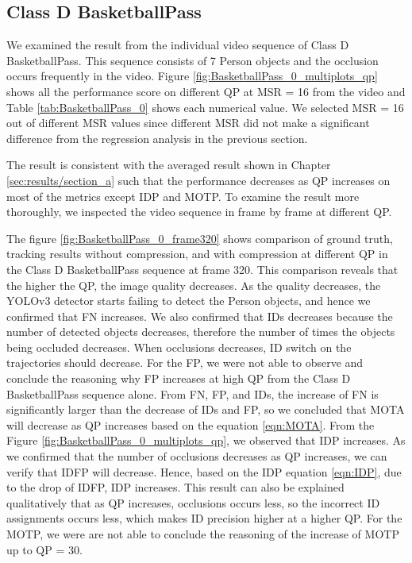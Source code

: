 \subsection{Class D BasketballPass}
We examined the result from the individual video sequence of Class D BasketballPass. This sequence consists of 7 Person objects and the occlusion occurs frequently in the video.  Figure \ref{fig:BasketballPass_0_multiplots_qp} shows all the performance score on different QP at MSR = 16 from the video and Table \ref{tab:BasketballPass_0} shows each numerical value. We selected MSR = 16 out of different MSR values since different MSR did not make a significant difference from the regression analysis in the previous section.


The result is consistent with the averaged result shown in Chapter \ref{sec:results/section_a} such that the performance decreases as QP increases on most of the metrics except IDP and MOTP. To examine the result more thoroughly, we inspected the video sequence in frame by frame at different QP.

The figure \ref{fig:BasketballPass_0_frame320} shows comparison of ground truth, tracking results without compression, and with compression at different QP in the Class D BasketballPass sequence at frame 320. This comparison reveals that the higher the QP, the image quality decreases. As the quality decreases, the YOLOv3 detector starts failing to detect the Person objects, and hence we confirmed that FN increases. We also confirmed that IDs decreases because the number of detected objects decreases, therefore the number of times the objects being occluded decreases. When occlusions decreases, ID switch on the trajectories should decrease. For the FP, we were not able to observe and conclude the reasoning why FP increases at high QP from the Class D BasketballPass sequence alone. From FN, FP, and IDs, the increase of FN is significantly larger than the decrease of IDs and FP, so we concluded that MOTA will decrease as QP increases based on the equation \ref{eqn:MOTA}. From the Figure \ref{fig:BasketballPass_0_multiplots_qp}, we observed that IDP increases. As we confirmed that the number of occlusions decreases as QP increases, we can verify that IDFP will decrease. Hence, based on the IDP equation \ref{eqn:IDP}, due to the drop of IDFP, IDP increases. This result can also be explained qualitatively that as QP increases, occlusions occurs less, so the incorrect ID assignments occurs less, which makes ID precision higher at a higher QP. For the MOTP, we were are not able to conclude the reasoning of the increase of MOTP up to QP = 30.

